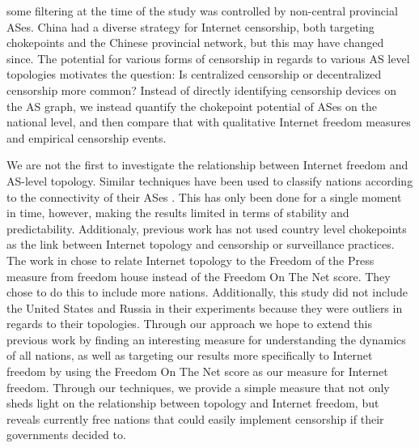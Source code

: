 some filtering at the time of the study was controlled by non-central provincial
ASes. China had a
diverse strategy for Internet censorship, both targeting chokepoints and the
Chinese provincial network, but this may have changed since. The potential for various forms of censorship in
regards to various AS level topologies motivates the question: Is centralized
censorship or decentralized censorship more common? Instead of directly
identifying censorship devices on the AS graph, we instead quantify the
chokepoint potential of ASes on the national level, and then compare that with
qualitative Internet freedom measures and empirical censorship events.
\par
We are not the first to investigate the relationship between Internet freedom and
AS-level topology. Similar techniques have been used to classify nations according
to the connectivity of their ASes \cite{politicsrouting}. This has only been done for a
single moment in time, however, making the results limited in terms of stability and predictability.
Additionaly, previous work has not used country level chokepoints as the link between Internet topology
and censorship or surveillance practices. The work in \cite{politicsrouting} chose to relate Internet topology
to the Freedom of the Press measure from freedom house instead of the Freedom On The Net score. They chose to do this
to include more nations. Additionally, this study did not include the United States and Russia in their experiments because they were
outliers in regards to their topologies. Through our approach we hope to extend this previous work by finding an interesting measure for
understanding the dynamics of all nations, as well as targeting our results more specifically to Internet freedom by using the Freedom On
The Net score as our measure for Internet freedom. Through our techniques, we provide a simple measure that not only 
sheds light on the relationship between topology and Internet freedom, but reveals currently free
nations that could easily implement censorship if their governments decided to.

